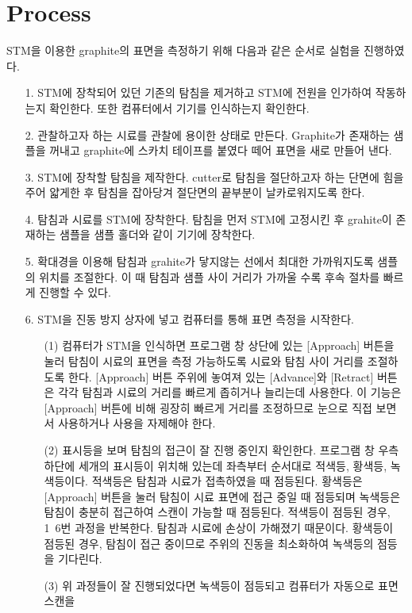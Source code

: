 \documentclass[aps,reprint,superscriptaddress,11pt]{revtex4-2}
\begin{document}
\section{Process}
STM을 이용한 graphite의 표면을 측정하기 위해 다음과 같은 순서로 실험을 진행하였다.
\begin{itemize}
  \item[1. ] STM에 장착되어 있던 기존의 탐침을 제거하고 STM에 전원을 인가하여 작동하는지 확인한다.
  또한 컴퓨터에서 기기를 인식하는지 확인한다.
  \item[2. ] 관찰하고자 하는 시료를 관찰에 용이한 상태로 만든다. Graphite가 존재하는 샘플을 
  꺼내고 graphite에 스카치 테이프를 붙였다 떼어 표면을 새로 만들어 낸다.
  \item[3. ] STM에 장착할 탐침을 제작한다. cutter로 탐침을 절단하고자 하는 단면에 힘을 주어
  얇게한 후 탐침을 잡아당겨 절단면의 끝부분이 날카로워지도록 한다.
  \item[4. ] 탐침과 시료를 STM에 장착한다. 탐침을 먼저 STM에 고정시킨 후 grahite이 존재하는 
  샘플을 샘플 홀더와 같이 기기에 장착한다.
  \item[5. ] 확대경을 이용해 탐침과 grahite가 닿지않는 선에서 최대한 가까워지도록 샘플의 위치를
  조절한다. 이 때 탐침과 샘플 사이 거리가 가까울 수록 후속 절차를 빠르게 진행할 수 있다.
  \item[6. ] STM을 진동 방지 상자에 넣고 컴퓨터를 통해 표면 측정을 시작한다. 
  \begin{itemize}
    \item[(1)] 컴퓨터가 STM을 인식하면 프로그램 창 상단에 있는 [Approach] 버튼을 눌러 탐침이
    시료의 표면을 측정 가능하도록 시료와 탐침 사이 거리를 조절하도록 한다. [Approach] 버튼 
    주위에 놓여져 있는 [Advance]와 [Retract] 버튼은 각각 탐침과 시료의 거리를 빠르게 좁히거나
    늘리는데 사용한다. 이 기능은 [Approach] 버튼에 비해 굉장히 빠르게 거리를 조정하므로
    눈으로 직접 보면서 사용하거나 사용을 자제해야 한다.
    \item[(2)] 표시등을 보며 탐침의 접근이 잘 진행 중인지 확인한다.
     프로그램 창 우측 하단에 세개의 표시등이 위치해 있는데 좌측부터 순서대로 적색등,
    황색등, 녹색등이다. 적색등은 탐침과 시료가 접촉하였을 때 점등된다. 황색등은 [Approach] 버튼을 
    눌러 탐침이 시료 표면에 접근 중일 때 점등되며 녹색등은 탐침이 충분히 접근하여 스캔이 가능할 때
    점등된다. 적색등이 점등된 경우, 1~6번 과정을 반복한다. 탐침과 시료에 손상이 가해졌기 때문이다.
    황색등이 점등된 경우, 탐침이 접근 중이므로 주위의 진동을 최소화하여 녹색등의 점등을 기다린다.
    \item[(3)] 위 과정들이 잘 진행되었다면 녹색등이 점등되고 컴퓨터가 자동으로 표면 스캔을 

\end{itemize}
\end{itemize}
\end{document}
